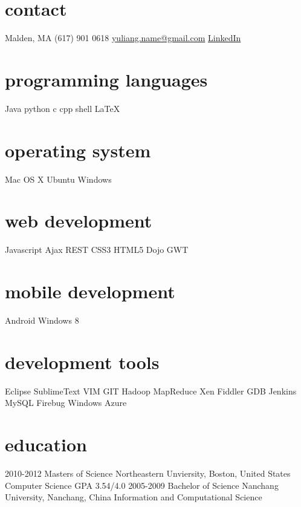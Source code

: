 \documentclass[]{ly-cv} %
\begin{document}
\begin{aside} %
\section{contact}
Malden, MA
(617) 901 0618
\href{mailto:yuliang.name@gmail.com}{yuliang.name@gmail.com}
\href{http://www.linkedin.com/in/liangyu2012neu}{LinkedIn}
\section{programming languages}
Java python c cpp 
shell \LaTeX
\section{operating system}
Mac OS X Ubuntu Windows
\section{web development}
Javascript Ajax REST
CSS3 HTML5 Dojo GWT
\section{mobile development}
Android Windows 8
\section{development tools}
Eclipse SublimeText VIM
GIT Hadoop MapReduce
Xen Fiddler GDB Jenkins 
MySQL Firebug Windows Azure
\end{aside}
\section{education}
\begin{entrylist}
\entry
{2010-2012}
{Masters of Science} 
{Northeastern Unviersity, Boston, United States}
{Computer Science \hspace{4mm} \footnotesize{GPA 3.54/4.0}}
\entry
{2005-2009}
{Bachelor of Science}
{Nanchang University, Nanchang, China}
{Information and Computational Science}
\end{entrylist}
\end{document}
